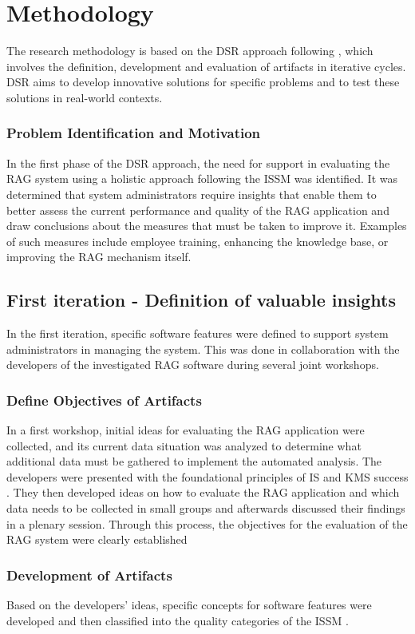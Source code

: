 \documentclass[
	english,
	ruledheaders=section,%
	class=report,%
	thesis={type=bachelor},%
	accentcolor=1b,%
	custommargins=true,%
	marginpar=false,%
	parskip=half-,%
	fontsize=11pt,%
	DIV=14,
]{tudapub}
\begin{document}
\chapter{Methodology}
The research methodology is based on the DSR approach following \cite{Peffers2007}, which involves the definition, development and evaluation of artifacts in iterative cycles. DSR aims to develop innovative solutions for specific problems and to test these solutions in real-world contexts.\\
\subsection{Problem Identification and Motivation}
In the first phase of the DSR approach, the need for support in evaluating the RAG system using a holistic approach following the ISSM \parencite{DeloneMcLean2003ISSuccessTenYearUpdate} was identified. It was determined that system administrators require insights that enable them to better assess the current performance and quality of the RAG application and draw conclusions about the measures that must be taken to improve it. Examples of such measures include employee training, enhancing the knowledge base, or improving the RAG mechanism itself.
\section{First iteration - Definition of valuable insights}
In the first iteration, specific software features were defined to support system administrators in managing the system. This was done in collaboration with the developers of the investigated RAG software during several joint workshops.
\subsection{Define Objectives of Artifacts}
In a first workshop, initial ideas for evaluating the RAG application were collected, and its current data situation was analyzed to determine what additional data must be gathered to implement the automated analysis. The developers were presented with the foundational principles of IS \parencite{DeloneMcLean2003ISSuccessTenYearUpdate} and KMS success \parencite{Jennex2006}. They then developed ideas on how to evaluate the RAG application and which data needs to be collected in small groups and afterwards discussed their findings in a plenary session. Through this process, the objectives for the evaluation of the RAG system were clearly established
\subsection{Development of Artifacts}
Based on the developers' ideas, specific concepts for software features were developed and then classified into the quality categories of the ISSM \parencite{DeloneMcLean2003ISSuccessTenYearUpdate}.
\end{document}
